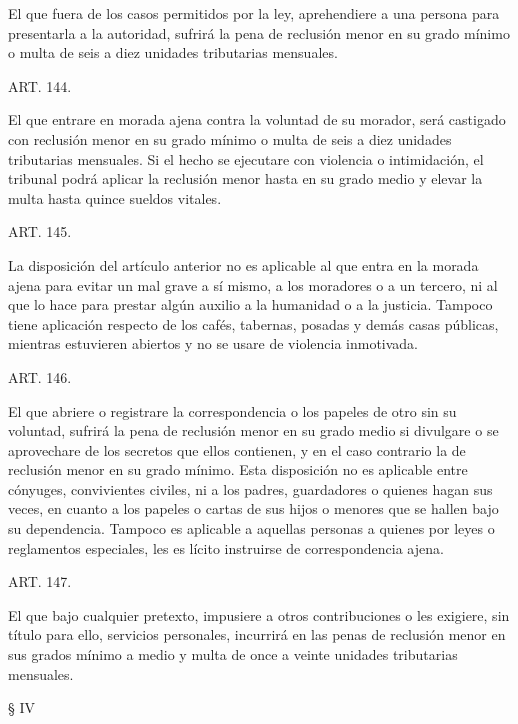     El que fuera de los casos permitidos por la ley, aprehendiere a una persona para presentarla a la autoridad, sufrirá la pena de reclusión menor en su grado mínimo o multa de seis a diez unidades tributarias mensuales.






    ART. 144.

    El que entrare en morada ajena contra la voluntad de su morador, será castigado con reclusión menor en su grado mínimo o multa de seis a diez unidades tributarias mensuales.
    Si el hecho se ejecutare con violencia o intimidación, el tribunal podrá aplicar la reclusión menor hasta en su grado medio y elevar la multa hasta quince sueldos vitales.




    ART. 145.

    La disposición del artículo anterior no es aplicable al que entra en la morada ajena para evitar un mal grave a sí mismo, a los moradores o a un tercero, ni al que lo hace para prestar algún auxilio a la humanidad o a la justicia.
    Tampoco tiene aplicación respecto de los cafés, tabernas, posadas y demás casas públicas, mientras estuvieren abiertos y no se usare de violencia inmotivada.


    ART. 146.

    El que abriere o registrare la correspondencia o los papeles de otro sin su voluntad, sufrirá la pena de reclusión menor en su grado medio si divulgare o se aprovechare de los secretos que ellos contienen, y en el caso contrario la de reclusión menor en su grado mínimo.
    Esta disposición no es aplicable entre cónyuges, convivientes civiles, ni a los padres, guardadores o quienes hagan sus veces, en cuanto a los papeles o cartas de sus hijos o menores que se hallen bajo su dependencia.
    Tampoco es aplicable a aquellas personas a quienes por leyes o reglamentos especiales, les es lícito instruirse de correspondencia ajena.




    ART. 147.

    El que bajo cualquier pretexto, impusiere a otros contribuciones o les exigiere, sin título para ello, servicios personales, incurrirá en las penas de reclusión menor en sus grados mínimo a medio y multa de once a veinte unidades tributarias mensuales.







    § IV


